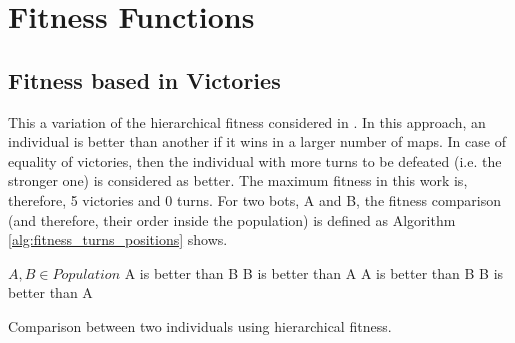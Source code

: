 \documentclass[preprint]{elsarticle}
\begin{document}
\section{Fitness Functions}
\label{sec:fitness_functions}



\subsection{Fitness based in Victories}
\label{subsec:fitness_turns}


This a variation of the hierarchical fitness considered in \cite{Genebot_CEC11}.
In this approach, an individual is better than another if it wins in a larger number of maps. In case of equality of victories, then the individual with more turns to be defeated (i.e. the stronger one) is considered as better. The maximum fitness in this work is, therefore, 5 victories and 0 turns. 
For two bots, A and B, the fitness comparison (and therefore, their order inside the population) is defined as Algorithm \ref{alg:fitness_turns_positions} shows.

\begin{algorithm}[ht]
\begin{algorithmic}
        
\STATE $A,B \in Population$
		\STATE A is better than B
	\ELSE
		\STATE B is better than A
	\ENDIF
\ELSE
		\STATE A is better than B
	\ELSE
		\STATE B is better than A
	\ENDIF
\ENDIF

\end{algorithmic}
\caption{Comparison between two individuals using hierarchical fitness.}
\label{alg:fitness_turns_positions}
\end{algorithm}
\end{document}
